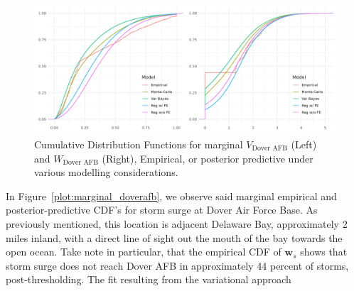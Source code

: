 \begin{figure}[ht]
    \caption{Cumulative Distribution Functions for marginal $V_{\text{Dover AFB}}$ (Left) and $W_{\text{Dover AFB}}$ (Right), Empirical, or posterior predictive under various modelling
    considerations.\label{Plot:marginal_doverafb}}
    \centering
    \includegraphics[width=\textwidth]{./plots/delaware_marginal_dover_afb.png}
\end{figure}

In Figure~\ref{plot:marginal_doverafb}, we observe said marginal empirical and posterior-predictive
    CDF's for storm surge at Dover Air Force Base.  As previously mentioned, this location is adjacent
    Delaware Bay, approximately 2 miles inland, with a direct line of sight out the mouth of the bay towards the open ocean.  Take note in particular, that the empirical CDF of $\bm{w}_s$ shows
    that storm surge does not reach Dover AFB in approximately \num{44} percent of storms, 
    post-thresholding.  The fit resulting from the variational approach








